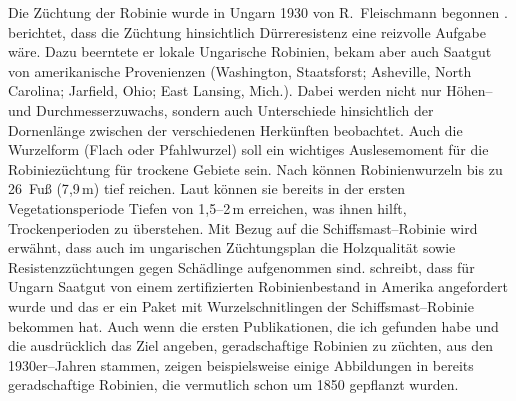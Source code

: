 \documentclass[twocolumn]{scrartcl}
\begin{document}
Die Züchtung der Robinie wurde in Ungarn 1930 von R.~Fleischmann
begonnen \citep{keresztesi1983robinie}. \citet{fleischmann1933robinie}
berichtet, dass die Züchtung hinsichtlich Dürreresistenz eine
reizvolle Aufgabe wäre. Dazu beerntete er lokale Ungarische Robinien,
bekam aber auch Saatgut von amerikanische Provenienzen (Washington,
Staatsforst; Asheville, North Carolina; Jarfield, Ohio; East Lansing,
Mich.). %
Dabei werden nicht nur Höhen-- und Durchmesserzuwachs, sondern auch
Unterschiede hinsichtlich der Dornenlänge zwischen der verschiedenen
Herkünften beobachtet.
Auch die Wurzelform (Flach oder Pfahlwurzel) soll ein wichtiges Auslesemoment
für die Robiniezüchtung für trockene Gebiete sein.
Nach \citet{bunger1938robinieWurzeltiefe} können Robinienwurzeln
bis zu 26~Fuß (7{,}9\,m) tief reichen. Laut \citet{lyr1967wurzel}
können sie bereits in der ersten Vegetationsperiode Tiefen von
1{,}5--2\,m erreichen, was ihnen hilft, Trockenperioden zu überstehen.
Mit Bezug auf die
Schiffsmast--Robinie \citep{raber1936shipmast} wird erwähnt, dass auch im
ungarischen Züchtungsplan die Holzqualität sowie Resistenzzüchtungen gegen
Schädlinge aufgenommen sind. \citet{mihalyi1937robinie} schreibt, dass für Ungarn
Saatgut von einem zertifizierten Robinienbestand in Amerika angefordert wurde
und das er ein Paket mit Wurzelschnitlingen der Schiffsmast--Robinie bekommen
hat. Auch wenn die ersten Publikationen, die ich gefunden habe und die
ausdrücklich das Ziel angeben, geradschaftige Robinien zu züchten, aus den
1930er--Jahren stammen, zeigen beispielsweise einige Abbildungen in
\citet{vadas1911robinie} bereits geradschaftige Robinien, die vermutlich schon um
1850 gepflanzt wurden.
\end{document}
